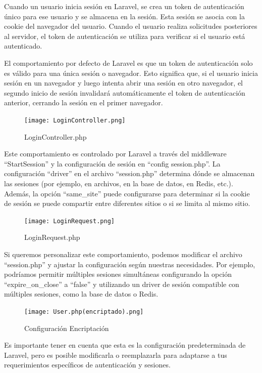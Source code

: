 \documentclass{article}
\begin{document}
Cuando un usuario inicia sesión en Laravel, se crea un token de autenticación único para ese usuario y se almacena en la sesión. Esta sesión se asocia con la cookie del navegador del usuario. Cuando el usuario realiza solicitudes posteriores al servidor, el token de autenticación se utiliza para verificar si el usuario está autenticado.

El comportamiento por defecto de Laravel es que un token de autenticación solo es válido para una única sesión o navegador. Esto significa que, si el usuario inicia sesión en un navegador y luego intenta abrir una sesión en otro navegador, el segundo inicio de sesión invalidará automáticamente el token de autenticación anterior, cerrando la sesión en el primer navegador.

\begin{figure}[!]
\centering
\texttt{[image: LoginController.png]}
\caption{\label{fig:014} LoginController.php}
\end{figure}

Este comportamiento es controlado por Laravel a través del middleware ``StartSession'' y la configuración de sesión en ``config\/ session.php''.  La configuración ``driver'' en el archivo ``session.php'' determina dónde se almacenan las sesiones (por ejemplo, en archivos, en la base de datos, en Redis, etc.). Además, la opción ``same\_site'' puede configurarse para determinar si la cookie de sesión se puede compartir entre diferentes sitios o si se limita al mismo sitio. 

\begin{figure}[!]
\centering
\texttt{[image: LoginRequest.png]}
\caption{\label{fig:015} LoginRequest.php}
\end{figure}

Si queremos personalizar este comportamiento, podemos modificar el archivo ``session.php'' y ajustar la configuración según nuestras necesidades. Por ejemplo, podríamos permitir múltiples sesiones simultáneas configurando la opción ``expire\_on\_close'' a ``false'' y utilizando un driver de sesión compatible con múltiples sesiones, como la base de datos o Redis.

\begin{figure}[!]
\centering
\texttt{[image: User.php(encriptado).png]}
\caption{\label{fig:016} Configuración Encriptación}
\end{figure}

Es importante tener en cuenta que esta es la configuración predeterminada de Laravel, pero es posible modificarla o reemplazarla para adaptarse a tus requerimientos específicos de autenticación y sesiones.\\
\end{document}
